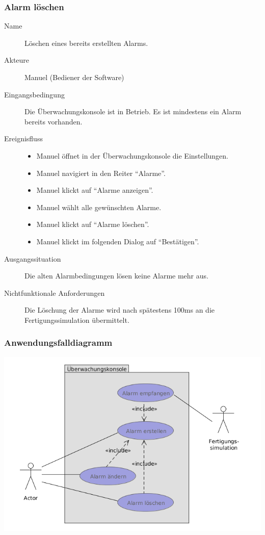 \documentclass[parskip=full]{scrartcl}
\begin{document}
\subsubsection{Alarm l\"oschen}
\begin{description}
 \item[Name] L\"oschen eines bereits erstellten Alarms.
 \item[Akteure] Manuel (Bediener der Software)
 \item[Eingangsbedingung] Die \"Uberwachungskonsole ist in Betrieb. Es ist mindestens ein Alarm bereits vorhanden.
 \item[Ereignisfluss]
 \begin{itemize}[noitemsep]
  \item Manuel \"offnet in der \"Uberwachungskonsole die Einstellungen.
  \item Manuel navigiert in den Reiter ``Alarme''.
  \item Manuel klickt auf ``Alarme anzeigen''.
  \item Manuel w\"ahlt alle gew\"unschten Alarme.
  \item Manuel klickt auf ``Alarme l\"oschen''.
  \item Manuel klickt im folgenden Dialog auf ``Best\"atigen''.
 \end{itemize}
 \item[Ausgangssituation] Die alten Alarmbedingungen l\"osen keine Alarme mehr aus.
 \item [Nichtfunktionale Anforderungen] Die L\"oschung der Alarme wird nach sp\"atestens 100ms an die Fertigungssimulation \"ubermittelt.
\end{description}

\subsubsection{Anwendungsfalldiagramm}
\begin{center}
  \includegraphics[scale=0.7]{media/UseCases/Ueberwachungskonsole.png}
\end{center}
\end{document}
